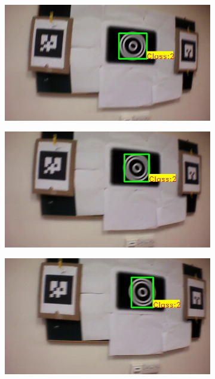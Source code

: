 \documentclass[runningheads]{llncs}
\begin{document}
\begin{figure}
\begin{subfigure}[b]{.19\textwidth}
\end{subfigure}
\begin{subfigure}[b]{.19\textwidth}
\includegraphics[width=\linewidth]{BLUT_input_10/output2.jpg}
\end{subfigure}
\begin{subfigure}[b]{.19\textwidth}
\includegraphics[width=\linewidth]{BLUT_input_10/output3.jpg}
\end{subfigure}
\begin{subfigure}[b]{.19\textwidth}
\includegraphics[width=\linewidth]{BLUT_input_10/output4.jpg}

\end{subfigure}
\end{figure}
\end{document}
